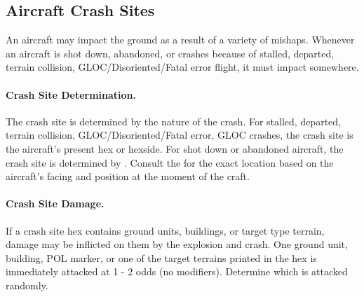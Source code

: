 \begin{advancedrules}
\section{Aircraft Crash Sites}


An aircraft may impact the ground as a result of a variety of mishaps. Whenever an aircraft is shot down, abandoned, or crashes because of stalled, departed, terrain collision, GLOC/Disoriented/Fatal error flight, it must impact somewhere.

\paragraph{Crash Site Determination.} The crash site is determined by the nature of the crash. For stalled, departed, terrain collision, GLOC/Disoriented/Fatal error, GLOC crashes, the crash site is the aircraft's present hex or hexside. For shot down or abandoned aircraft, the crash site is determined by . Consult the  for the exact location based on the aircraft's facing and position at the moment of the craft.

\paragraph{Crash Site Damage.} If a crash site hex contains ground units, buildings, or target type terrain, damage may be inflicted on them by the explosion and crash. One ground unit, building, POL marker, or one of the target terrains printed in the hex is immediately attacked at 1 - 2 odds (no modifiers). Determine which is attacked randomly.

\end{advancedrules}
